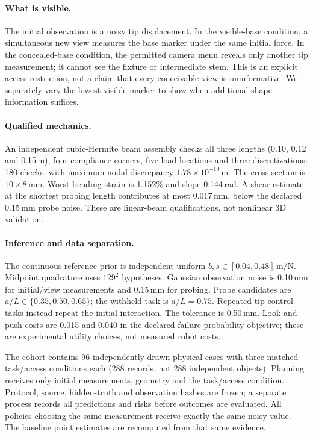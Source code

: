 \documentclass[10pt,twocolumn,letterpaper]{article}
\begin{document}
\paragraph{What is visible.}
The initial observation is a noisy tip displacement. In the visible-base condition, a simultaneous new view measures the base marker under the same initial force. In the concealed-base condition, the permitted camera menu reveals only another tip measurement; it cannot see the fixture or intermediate stem. This is an explicit access restriction, not a claim that every conceivable view is uninformative. We separately vary the lowest visible marker to show when additional shape information suffices.

\paragraph{Qualified mechanics.}
An independent cubic-Hermite beam assembly checks all three lengths (0.10, 0.12 and 0.15\,m), four compliance corners, five load locations and three discretizations: 180 checks, with maximum nodal discrepancy $1.78\times10^{-10}$\,m. The cross section is $10\times8$\,mm. Worst bending strain is 1.152\% and slope 0.144\,rad. A shear estimate at the shortest probing length contributes at most 0.017\,mm, below the declared 0.15\,mm probe noise. These are linear-beam qualifications, not nonlinear 3D validation.

\paragraph{Inference and data separation.}
The continuous reference prior is independent uniform $b,s\in[0.04,0.48]$\,m/N. Midpoint quadrature uses $129^2$ hypotheses. Gaussian observation noise is 0.10\,mm for initial/view measurements and 0.15\,mm for probing. Probe candidates are $a/L\in\{0.35,0.50,0.65\}$; the withheld task is $a/L=0.75$. Repeated-tip control tasks instead repeat the initial interaction. The tolerance is 0.50\,mm. Look and push costs are 0.015 and 0.040 in the declared failure-probability objective; these are experimental utility choices, not measured robot costs.

The cohort contains 96 independently drawn physical cases with three matched task/access conditions each (288 records, not 288 independent objects). Planning receives only initial measurements, geometry and the task/access condition. Protocol, source, hidden-truth and observation hashes are frozen; a separate process records all predictions and risks before outcomes are evaluated. All policies choosing the same measurement receive exactly the same noisy value. The baseline point estimates are recomputed from that same evidence.
\end{document}
